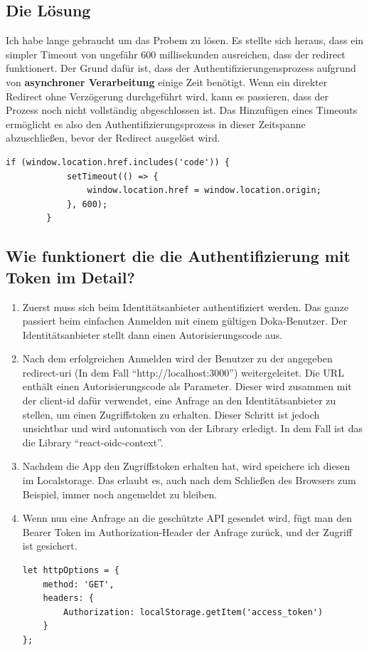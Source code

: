 \subsection*{Die Lösung}
Ich habe lange gebraucht um das Probem zu lösen. Es stellte sich heraus, dass ein simpler Timeout von ungefähr 600 millisekunden 
ausreichen, dass der redirect funktionert. Der Grund dafür ist, dass der Authentifizierungensprozess aufgrund von 
\textbf{asynchroner Verarbeitung} einige Zeit benötigt. Wenn ein direkter Redirect ohne Verzögerung durchgeführt wird, kann es passieren, 
dass der Prozess noch nicht vollständig abgeschlossen ist. Das Hinzufügen eines Timeouts ermöglicht es also den 
Authentifizierungsprozess in dieser Zeitspanne abzuschließen, bevor der Redirect ausgelöst wird.

\begin{lstlisting}[caption=Timeout setzen]
  if (window.location.href.includes('code')) {
            setTimeout(() => {
                window.location.href = window.location.origin;
            }, 600);
        }
\end{lstlisting}
\newpage
\subsection*{Wie funktionert die die Authentifizierung mit Token im Detail?}
\begin{enumerate}
\item Zuerst muss sich beim Identitätsanbieter authentifiziert werden. Das ganze passiert
beim einfachen Anmelden mit einem gültigen Doka-Benutzer. Der Identitätsanbieter stellt dann einen Autorisierungscode aus.\\
\item Nach dem erfolgreichen Anmelden wird der Benutzer zu der angegeben redirect-uri (In dem Fall ``http://localhost:3000'') weitergeleitet.
Die URL enthält einen Autorisierungscode als Parameter. Dieser wird zusammen mit der client-id dafür verwendet, eine Anfrage an den
Identitätsanbieter zu stellen, um einen Zugriffstoken zu erhalten. Dieser Schritt ist jedoch unsichtbar und wird automatisch von der 
Library erledigt. In dem Fall ist das die Library ``react-oidc-context''.\\
\item Nachdem die App den Zugriffstoken erhalten hat, wird speichere ich diesen im Localstorage. Das erlaubt es,
auch nach dem Schließen des Browsers zum Beispiel, immer noch angemeldet zu bleiben.\\
\item Wenn nun eine Anfrage an die geschützte API gesendet wird, fügt man den Bearer Token im
Authorization-Header der Anfrage zurück, und der Zugriff ist gesichert.
\begin{lstlisting}[caption=Authorization-Header]
  let httpOptions = {
    method: 'GET',
    headers: {
        Authorization: localStorage.getItem('access_token')
    }
};
\end{lstlisting}

\end{enumerate}
\newpage

